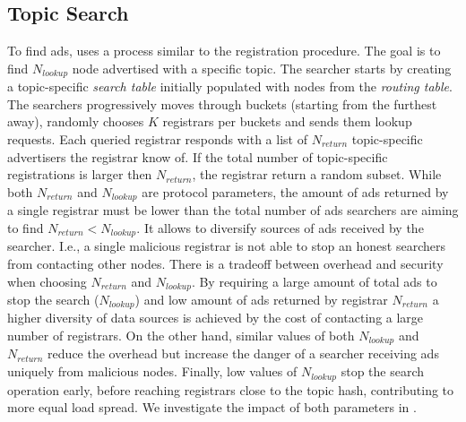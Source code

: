 \subsection{Topic Search}\label{sec:lookup}
To find ads, \sysname uses a process similar to the registration procedure. 
The goal is to find $N_\textit{lookup}$ node advertised with a specific topic. 
The searcher starts by creating a topic-specific \emph{search table} initially populated with nodes from the \emph{routing table}. 
The searchers progressively moves through buckets (starting from the furthest away), randomly chooses $K$ registrars per buckets and sends them lookup requests. 
Each queried registrar responds with a list of $N_\textit{return}$ topic-specific advertisers the registrar know of. If the total number of topic-specific registrations is larger then $N_\textit{return}$, the registrar return a random subset. While both $N_\textit{return}$ and $N_\textit{lookup}$ are protocol parameters, the amount of ads returned by a single registrar must be lower than the total number of ads searchers are aiming to find $N_\textit{return} < N_\textit{lookup}$. It allows to diversify sources of ads received by the searcher. I.e., a single malicious registrar is not able to stop an honest searchers from contacting other nodes.
There is a tradeoff between overhead and security when choosing $N_\textit{return}$ and $N_\textit{lookup}$. 
By requiring a large amount of total ads to stop the search ($N_\textit{lookup}$) and low amount of ads returned by registrar $N_\textit{return}$ a higher diversity of data sources is achieved by the cost of contacting a large number of registrars. On the other hand, similar values of both $N_\textit{lookup}$ and $N_\textit{return}$ reduce the overhead but increase the danger of a searcher receiving ads uniquely from malicious nodes. Finally, low values of $N_\textit{lookup}$ stop the search operation early,  before reaching registrars close to the topic hash, contributing to more equal load spread. We investigate the impact of both parameters in .

